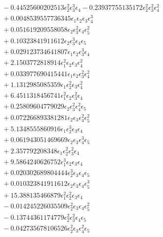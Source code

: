 \documentclass[10pt]{article}
\begin{document}
\begin{align*}
&{}  - 0.44525600202513 \epsilon_{2}^{2} \epsilon_{3}^{3} \epsilon_{4} - 0.23937755135172 \epsilon_{2}^{2} \epsilon_{3}^{2} \epsilon_{4}^{2} \\
&{}  + 0.0048539557736345 \epsilon_{1} \epsilon_{2} \epsilon_{3} \epsilon_{4}^{3} \\
&{}  + 0.051619209558058 \epsilon_{2} \epsilon_{3}^{2} \epsilon_{4} \epsilon_{5}^{2} \\
&{}  + 0.10323841911612 \epsilon_{2} \epsilon_{3}^{3} \epsilon_{4} \epsilon_{5} \\
&{}  + 0.029123734641807 \epsilon_{1} \epsilon_{2} \epsilon_{3}^{3} \epsilon_{4} \\
&{}  + 2.1503772818914 \epsilon_{1}^{2} \epsilon_{2} \epsilon_{3} \epsilon_{4}^{2} \\
&{}  + 0.033977690415441 \epsilon_{1} \epsilon_{2} \epsilon_{3}^{2} \epsilon_{4}^{2} \\
&{}  + 1.1312985085359 \epsilon_{1} \epsilon_{2}^{2} \epsilon_{3} \epsilon_{4}^{2} \\
&{}  + 6.4511318456741 \epsilon_{1}^{2} \epsilon_{2} \epsilon_{3}^{2} \epsilon_{4} \\
&{}  + 0.25809604779029 \epsilon_{2} \epsilon_{3}^{2} \epsilon_{4}^{2} \epsilon_{5} \\
&{}  + 0.072266893381281 \epsilon_{2} \epsilon_{3} \epsilon_{4}^{2} \epsilon_{5}^{2} \\
&{}  + 5.1348555860916 \epsilon_{1} \epsilon_{2}^{3} \epsilon_{3} \epsilon_{4} \\
&{}  + 0.061943051469669 \epsilon_{2} \epsilon_{3} \epsilon_{4}^{3} \epsilon_{5} \\
&{}  + 2.357792208348 \epsilon_{1} \epsilon_{2}^{2} \epsilon_{3}^{2} \epsilon_{4} \\
&{}  + 9.5864240626752 \epsilon_{1}^{3} \epsilon_{2} \epsilon_{3} \epsilon_{4} \\
&{}  + 0.020302689804444 \epsilon_{2}^{3} \epsilon_{3} \epsilon_{4} \epsilon_{5} \\
&{}  + 0.010323841911612 \epsilon_{2} \epsilon_{3} \epsilon_{4} \epsilon_{5}^{3} \\
&{}  + 15.388135466879 \epsilon_{1}^{2} \epsilon_{2}^{2} \epsilon_{3} \epsilon_{4} \\
&{}  - 0.014245226035509 \epsilon_{2}^{2} \epsilon_{3} \epsilon_{4} \epsilon_{5}^{2} \\
&{}  - 0.13744361174779 \epsilon_{2}^{2} \epsilon_{3}^{2} \epsilon_{4} \epsilon_{5} \\
&{}  - 0.042735678106526 \epsilon_{2}^{2} \epsilon_{3} \epsilon_{4}^{2} \epsilon_{5} \\

\end{align*}
\end{document}

